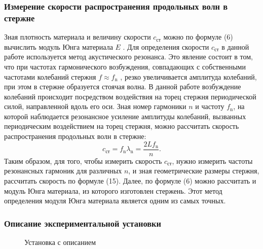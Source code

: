 \documentclass[a4paper, 12pt]{article}%
\begin{document}
\subsubsection{Измерение скорости распространения  
продольных волн в стержне}
Зная плотность материала и величину скорости $c_{\text{ст}}$ можно по формуле (6) вычислить модуль Юнга материала $E$ . Для определения скорости $c_{\text{ст}}$ в данной работе используется метод акустического резонанса. Это явление состоит в том, что при частотах гармонического возбуждения, совпадающих с собственными частотами колебаний стержня $f\approx f_{\text{n}}$ , резко
увеличивается амплитуда колебаний, при этом в стержне образуется стоячая волна.
В данной работе возбуждение колебаний происходит посредством воздействия
на торец стержня периодической силой, направленной вдоль его
оси. Зная номер гармоники $n$ и частоту $f_{\text{n}}$, на которой наблюдается резонансное
усиление амплитуды колебаний, вызванных периодическим воздействием
на торец стержня, можно рассчитать скорость распространения
продольных волн в стержне:
\begin{equation}
c_{\text{ст}}=f_{\text{n}}\lambda_{\text{n}}=\dfrac{2Lf_{\text{n}}}{n}.
\end{equation}
Таким образом, для того, чтобы измерить скорость $c_{\text{ст}}$, нужно измерить частоты резонансных гармоник для различных $n$, и зная геометрические размеры стержня, рассчитать скорость по формуле (15). Далее, по формуле (6) можно рассчитать и модуль Юнга материала, из которого изготовлен стержень. Этот метод определения модуля Юнга материала является одним из самых точных. 
\subsubsection{Описание экспериментальной установки}
\begin{figure}[h!]
\caption{Установка с описанием}
\end{figure}
\end{document}
